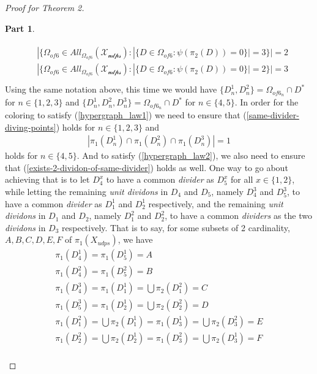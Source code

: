 \documentclass[11pt, oneside]{article}      %
\theoremstyle{definition}
\newtheorem{proofpart}{Part}[theo]
\numberwithin{equation}{section}
\newcommand{\reff}[1]{(\ref{#1})}
\theoremstyle{c}
\begin{document}
\begin{proof}[Proof for Theorem 2]
\begin{proofpart}
\begin{enumerate}[I.]
\begin{align}
\begin{split}
& |\{ \Omega_{of 6}  \in All_{\Omega_{of 6}}(\mathscr{X_{udps}}) :  |\{D \in \Omega_{of 6} : \psi(\pi_2(D)) = 0 \}| = 3 \}| = 2 \\
& |\{ \Omega_{of 6}  \in All_{\Omega_{of 6}}(\mathscr{X_{udps}}) :  |\{D \in \Omega_{of 6} : \psi(\pi_2(D)) = 0 \}| = 2 \}| = 3 \\
\end{split}
\end{align}
Using the same notation above, this time we would have $\{D_n^1,D_n^2\} = \Omega_{of 6_n} \cap D^*$ for $n \in \{1,2,3\}$ and $ \{D_n^1,D_n^2,D_n^3\} = \Omega_{of 6_n} \cap D^*$ for $n \in \{4,5\}$. In order for the coloring to satisfy \reff{hypergraph_law1} we need to ensure that \reff{same-divider-diving-points} holds for $n \in \{1,2,3\}$ and
\begin{equation}
\begin{gathered}\label{divider_one_in_common}
|\pi_1(D_n^1) \cap \pi_1(D_n^2) \cap \pi_1(D_n^3)| =1
\end{gathered}
\end{equation}
holds for $n \in \{4,5\}$. And to satisfy \reff{hypergraph_law2}, we also need to ensure that  \reff{exists-2-dividon-of-same-divider} holds as well. One way to go about achieving that is to let $D_4^x$ to have a common \textit{divider} as $D_5^x$ for all $x \in \{1,2\}$, while letting the remaining \textit{unit dividons} in $D_4$ and $D_5$, namely $D_4^3$  and $D_5^3$, to have a common \textit{divider} as $D_1^1$ and $D_2^1$ respectively, and the remaining \textit{unit dividons} in $D_1$ and $D_2$, namely $D_1^2$  and $D_2^2$, to have a common \textit{dividers} as the two \textit{dividons} in $D_3$ respectively.  That is to say, for some subsets of 2 cardinality, $A,B,C,D,E,F$ of $\pi_1(X_{udps})$, we have
\begin{equation}
\begin{gathered}
\pi_1(D_4^1) = \pi_1(D_5^1) = A\\
\pi_1(D_4^2) = \pi_1(D_5^2) = B\\
\pi_1(D_4^3) = \pi_1(D_1^1) = \bigcup \pi_2(D_1^2)  = C\\
\pi_1(D_5^3) = \pi_1(D_2^1) = \bigcup \pi_2(D_2^2)  = D\\
\pi_1(D_1^2) = \bigcup \pi_2(D_1^1) = \pi_1(D_3^1) =\bigcup \pi_2(D_3^2) = E \\
\pi_1(D_2^2) = \bigcup \pi_2(D_2^1) = \pi_1(D_3^2) =\bigcup \pi_2(D_3^1) = F \\

\end{gathered}
\end{equation}
\end{enumerate}
\end{proofpart}
\end{proof}
\end{document}
